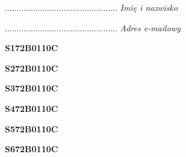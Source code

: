 \begin{turn}{90}\begin{minipage}{\linewidth} \vspace{20mm} ................................................  \textit{Imię i nazwisko}\end{minipage}\end{turn}

\begin{turn}{90}\begin{minipage}{\linewidth} \vspace{20mm} ................................................  \textit{Adres e-mailowy}\end{minipage}\end{turn}

\begin{turn}{90}\huge \begin{minipage}{\linewidth} \vspace{10mm}\textbf{S172B0110C}\end{minipage}\end{turn}

\begin{turn}{90}\huge \begin{minipage}{\linewidth} \vspace{10mm}\textbf{S272B0110C}\end{minipage}\end{turn}

\begin{turn}{90}\huge \begin{minipage}{\linewidth} \vspace{10mm}\textbf{S372B0110C}\end{minipage}\end{turn}

\begin{turn}{90}\huge \begin{minipage}{\linewidth} \vspace{10mm}\textbf{S472B0110C}\end{minipage}\end{turn}

\begin{turn}{90}\huge \begin{minipage}{\linewidth} \vspace{10mm}\textbf{S572B0110C}\end{minipage}\end{turn}

\begin{turn}{90}\huge \begin{minipage}{\linewidth} \vspace{10mm}\textbf{S672B0110C}\end{minipage}\end{turn}

